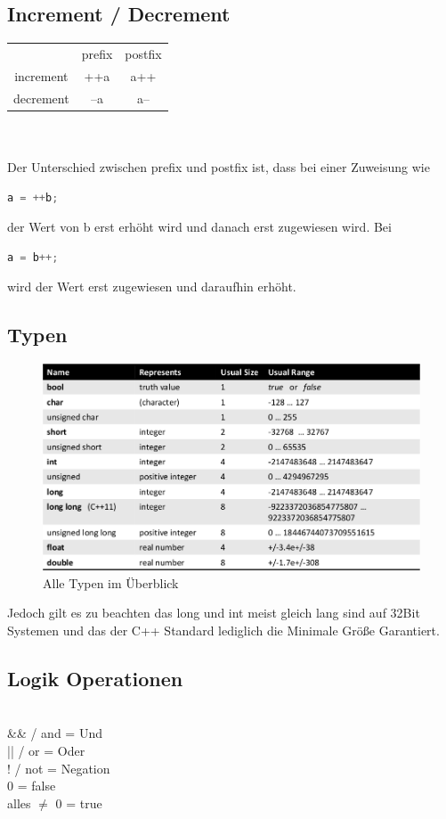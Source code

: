 \subsection{Increment / Decrement}
\begin{tabular}{ccc}
	& prefix & postfix \\ 
increment	& ++a & a++  \\ 
decrement	& --a & a-- \\ 
\end{tabular} \\\qquad \\
Der Unterschied zwischen prefix und postfix ist, dass bei einer Zuweisung wie
\begin{lstlisting}[language=C++] 
a = ++b;
\end{lstlisting}
der Wert von b erst erhöht wird und danach erst zugewiesen wird. Bei 
\begin{lstlisting}[language=C++] 
a = b++;
\end{lstlisting}
wird der Wert erst zugewiesen und daraufhin erhöht. 
\subsection{Typen}
\begin{figure}[h]
\centering
\includegraphics[width=0.75\linewidth]{mainmatter/pics/typ}
\caption[typen]{Alle Typen im Überblick}
\label{fig:typ}
\end{figure}
Jedoch gilt es zu beachten das long und int meist gleich lang sind auf 32Bit Systemen und das der C++ Standard lediglich die Minimale Größe Garantiert.
\subsection{Logik Operationen}\qquad\\
\&\& / and = Und\\
|| / or = Oder\\
! / not = Negation\\
0 = false\\
alles $\neq$ 0 = true
